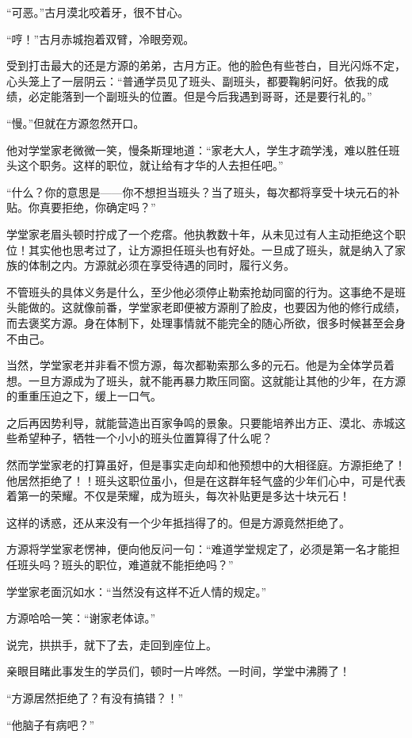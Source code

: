 \begin{this_body}
“可恶。”古月漠北咬着牙，很不甘心。

“哼！”古月赤城抱着双臂，冷眼旁观。

受到打击最大的还是方源的弟弟，古月方正。他的脸色有些苍白，目光闪烁不定，心头笼上了一层阴云：“普通学员见了班头、副班头，都要鞠躬问好。依我的成绩，必定能落到一个副班头的位置。但是今后我遇到哥哥，还是要行礼的。”

“慢。”但就在方源忽然开口。

他对学堂家老微微一笑，慢条斯理地道：“家老大人，学生才疏学浅，难以胜任班头这个职务。这样的职位，就让给有才华的人去担任吧。”

“什么？你的意思是——你不想担当班头？当了班头，每次都将享受十块元石的补贴。你真要拒绝，你确定吗？”

学堂家老眉头顿时拧成了一个疙瘩。他执教数十年，从未见过有人主动拒绝这个职位！其实他也思考过了，让方源担任班头也有好处。一旦成了班头，就是纳入了家族的体制之内。方源就必须在享受待遇的同时，履行义务。

不管班头的具体义务是什么，至少他必须停止勒索抢劫同窗的行为。这事绝不是班头能做的。这就像前番，学堂家老即便被方源削了脸皮，也要因为他的修行成绩，而去褒奖方源。身在体制下，处理事情就不能完全的随心所欲，很多时候甚至会身不由己。

当然，学堂家老并非看不惯方源，每次都勒索那么多的元石。他是为全体学员着想。一旦方源成为了班头，就不能再暴力欺压同窗。这就能让其他的少年，在方源的重重压迫之下，缓上一口气。

之后再因势利导，就能营造出百家争鸣的景象。只要能培养出方正、漠北、赤城这些希望种子，牺牲一个小小的班头位置算得了什么呢？

然而学堂家老的打算虽好，但是事实走向却和他预想中的大相径庭。方源拒绝了！他居然拒绝了！！班头这职位虽小，但是在这群年轻气盛的少年们心中，可是代表着第一的荣耀。不仅是荣耀，成为班头，每次补贴更是多达十块元石！

这样的诱惑，还从来没有一个少年抵挡得了的。但是方源竟然拒绝了。

方源将学堂家老愣神，便向他反问一句：“难道学堂规定了，必须是第一名才能担任班头吗？班头的职位，难道就不能拒绝吗？”

学堂家老面沉如水：“当然没有这样不近人情的规定。”

方源哈哈一笑：“谢家老体谅。”

说完，拱拱手，就下了去，走回到座位上。

亲眼目睹此事发生的学员们，顿时一片哗然。一时间，学堂中沸腾了！

“方源居然拒绝了？有没有搞错？！”

“他脑子有病吧？”


\end{this_body}
